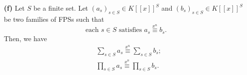 \begin{theorem}
\textbf{(f)} Let $S$ be a finite set. Let $\left(a_{s}\right)_{s\in S}\in
K\left[\left[x\right]\right]^{S}$ and $\left(b_{s}\right)_{s\in
S}\in K\left[\left[x\right]\right]^{S}$ be two families of FPSs such
that
\begin{equation}
\text{each }s\in S\text{ satisfies }a_{s}\overset{x^{n}}{\equiv}b_{s}.
\label{eq.thm.fps.xneq.props.e.ass}
\end{equation}
Then, we have
\begin{align}
&  \sum_{s\in S}a_{s}\overset{x^{n}}{\equiv}\sum_{s\in S}b_{s}
;\label{eq.thm.fps.xneq.props.e.+}\\
&  \prod_{s\in S}a_{s}\overset{x^{n}}{\equiv}\prod_{s\in S}b_{s}.
\label{eq.thm.fps.xneq.props.e.*}
\end{align}
\end{theorem}

